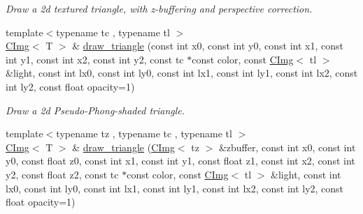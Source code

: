 \begin{DoxyCompactItemize}
\begin{DoxyCompactList}\small\item\em Draw a 2d textured triangle, with z-\/buffering and perspective correction. \item\end{DoxyCompactList}\item 
{\footnotesize template$<$typename tc , typename tl $>$ }\\\hyperlink{structcimg__library_1_1CImg}{CImg}$<$ T $>$ \& \hyperlink{structcimg__library_1_1CImg_acdcbe236d763eb011eebb30b50c1aef7}{draw\_\-triangle} (const int x0, const int y0, const int x1, const int y1, const int x2, const int y2, const tc $\ast$const color, const \hyperlink{structcimg__library_1_1CImg}{CImg}$<$ tl $>$ \&light, const int lx0, const int ly0, const int lx1, const int ly1, const int lx2, const int ly2, const float opacity=1)
\begin{DoxyCompactList}\small\item\em Draw a 2d Pseudo-\/Phong-\/shaded triangle. \item\end{DoxyCompactList}\item 
\hypertarget{structcimg__library_1_1CImg_a4e50f2ccb5277e204a00edf4e9d2b28d}{
{\footnotesize template$<$typename tz , typename tc , typename tl $>$ }\\\hyperlink{structcimg__library_1_1CImg}{CImg}$<$ T $>$ \& \hyperlink{structcimg__library_1_1CImg_a4e50f2ccb5277e204a00edf4e9d2b28d}{draw\_\-triangle} (\hyperlink{structcimg__library_1_1CImg}{CImg}$<$ tz $>$ \&zbuffer, const int x0, const int y0, const float z0, const int x1, const int y1, const float z1, const int x2, const int y2, const float z2, const tc $\ast$const color, const \hyperlink{structcimg__library_1_1CImg}{CImg}$<$ tl $>$ \&light, const int lx0, const int ly0, const int lx1, const int ly1, const int lx2, const int ly2, const float opacity=1)}
\label{structcimg__library_1_1CImg_a4e50f2ccb5277e204a00edf4e9d2b28d}


\end{DoxyCompactItemize}
